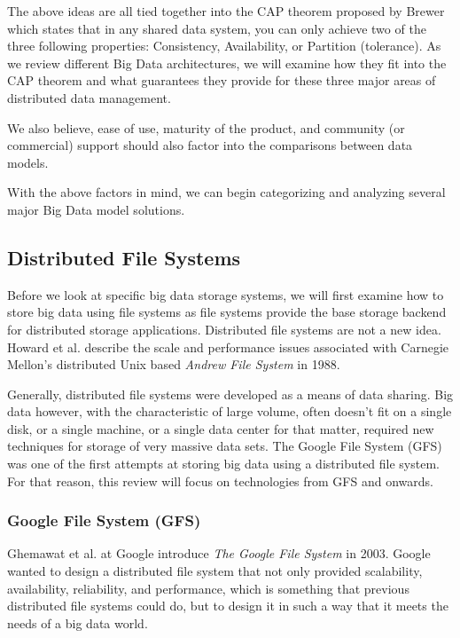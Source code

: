 \documentclass[]{article}
\begin{document}
The above ideas are all tied together into the CAP theorem proposed by Brewer\cite{brewer2000towards} which states that in any shared data system, you can only achieve two of the three following properties: Consistency, Availability, or Partition (tolerance). As we review different Big Data architectures, we will examine how they fit into the CAP theorem and what guarantees they provide for these three major areas of distributed data management.

We also believe, ease of use, maturity of the product, and community (or commercial) support should also factor into the comparisons between data models. 

With the above factors in mind, we can begin categorizing and analyzing several major Big Data model solutions.


\subsection{Distributed File Systems}
Before we look at specific big data storage systems, we will first examine how to store big data using file systems as file systems provide the base storage backend for distributed storage applications. Distributed file systems are not a new idea. Howard et al.\cite{howard_scale_1988} describe the scale and performance issues associated with Carnegie Mellon's distributed Unix based \textit{Andrew File System} in 1988. 

Generally, distributed file systems were developed as a means of data sharing. Big data however, with the characteristic of large volume, often doesn't fit on a single disk, or a single machine, or a  single data center for that matter, required new techniques for storage of very massive data sets. The Google File System (GFS) was one of the first attempts at storing big data using a distributed file system. For that reason, this review will focus on technologies from GFS and onwards. 

\subsubsection{Google File System (GFS)}
Ghemawat et al. at Google introduce \textit{The Google File System}\cite{ghemawat_google_2003} in 2003. Google wanted to design a distributed file system that not only provided scalability, availability, reliability, and performance, which is something that previous distributed file systems could do, but to design it in such a way that it meets the needs of a big data world. 
\end{document}
